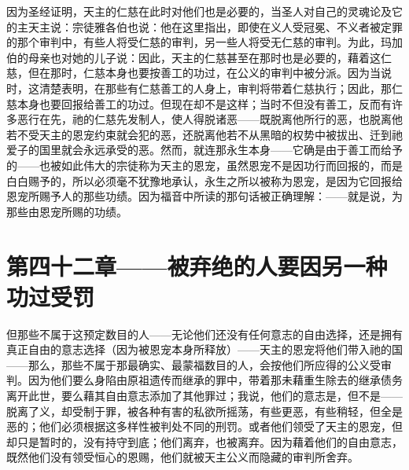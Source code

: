 因为圣经证明，天主的仁慈在此时对他们也是必要的，当圣人对自己的灵魂论及它的主天主说：宗徒雅各伯也说：他在这里指出，即使在义人受冠冕、不义者被定罪的那个审判中，有些人将受仁慈的审判，另一些人将受无仁慈的审判。为此，玛加伯的母亲也对她的儿子说：因此，天主的仁慈甚至在那时也是必要的，藉着这仁慈，但在那时，仁慈本身也要按善工的功过，在公义的审判中被分派。因为当说时，这清楚表明，在那些有仁慈善工的人身上，审判将带着仁慈执行；因此，那仁慈本身也要回报给善工的功过。但现在却不是这样；当时不但没有善工，反而有许多恶行在先，祂的仁慈先发制人，使人得脱诸恶——既脱离他所行的恶，也脱离他若不受天主的恩宠约束就会犯的恶，还脱离他若不从黑暗的权势中被拔出、迁到祂爱子的国里就会永远承受的恶。然而，就连那永生本身——它确是由于善工而给予的——也被如此伟大的宗徒称为天主的恩宠，虽然恩宠不是因功行而回报的，而是白白赐予的，所以必须毫不犹豫地承认，永生之所以被称为恩宠，是因为它回报给恩宠所赐予人的那些功绩。因为福音中所读的那句话被正确理解：——就是说，为那些由恩宠所赐的功绩。\par


\section{第四十二章——被弃绝的人要因另一种功过受罚}

但那些不属于这预定数目的人——无论他们还没有任何意志的自由选择，还是拥有真正自由的意志选择（因为被恩宠本身所释放）——天主的恩宠将他们带入祂的国——那么，那些不属于那最确实、最蒙福数目的人，会按他们所应得的公义受审判。因为他们要么身陷由原祖遗传而继承的罪中，带着那未藉重生除去的继承债务离开此世，要么藉其自由意志添加了其他罪过；我说，他们的意志是，但不是——脱离了义，却受制于罪，被各种有害的私欲所摇荡，有些更恶，有些稍轻，但全是恶的；他们必须根据这多样性被判处不同的刑罚。或者他们领受了天主的恩宠，但却只是暂时的，没有持守到底；他们离弃，也被离弃。因为藉着他们的自由意志，既然他们没有领受恒心的恩赐，他们就被天主公义而隐藏的审判所舍弃。\par

